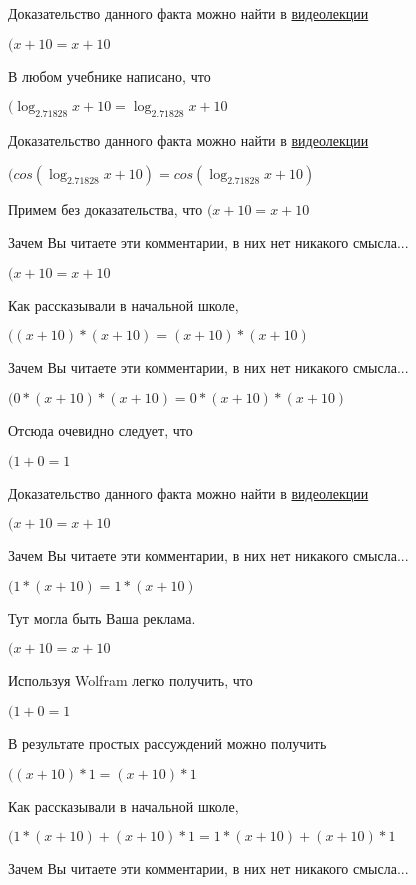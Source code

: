 \documentclass[12pt,a4paper,fleqn]{article}
\theoremstyle{definition}
\begin{document}
Доказательство данного факта можно найти в \href{https://www.youtube.com/watch?v=dQw4w9WgXcQ}{видеолекции}

$( x  +  10  =  x  +  10 $

В любом учебнике написано, что

$(\log_{ 2.71828 }{ x  +  10 } = \log_{ 2.71828 }{ x  +  10 }$

Доказательство данного факта можно найти в \href{https://www.youtube.com/watch?v=dQw4w9WgXcQ}{видеолекции}

$(cos(\log_{ 2.71828 }{ x  +  10 }) = cos(\log_{ 2.71828 }{ x  +  10 })$

Примем без доказательства, что
$( x  +  10  =  x  +  10 $

Зачем Вы читаете эти комментарии, в них нет никакого смысла...

$( x  +  10  =  x  +  10 $

Как рассказывали в начальной школе,

$(( x  +  10 ) * ( x  +  10 ) = ( x  +  10 ) * ( x  +  10 )$

Зачем Вы читаете эти комментарии, в них нет никакого смысла...

$( 0  * ( x  +  10 ) * ( x  +  10 ) =  0  * ( x  +  10 ) * ( x  +  10 )$

Отсюда очевидно следует, что

$( 1  +  0  =  1 $

Доказательство данного факта можно найти в \href{https://www.youtube.com/watch?v=dQw4w9WgXcQ}{видеолекции}

$( x  +  10  =  x  +  10 $

Зачем Вы читаете эти комментарии, в них нет никакого смысла...

$( 1  * ( x  +  10 ) =  1  * ( x  +  10 )$

Тут могла быть Ваша реклама.

$( x  +  10  =  x  +  10 $

Используя Wolfram легко получить, что

$( 1  +  0  =  1 $

В результате простых рассуждений можно получить

$(( x  +  10 ) *  1  = ( x  +  10 ) *  1 $

Как рассказывали в начальной школе,

$( 1  * ( x  +  10 ) + ( x  +  10 ) *  1  =  1  * ( x  +  10 ) + ( x  +  10 ) *  1 $

Зачем Вы читаете эти комментарии, в них нет никакого смысла...
\end{document}
